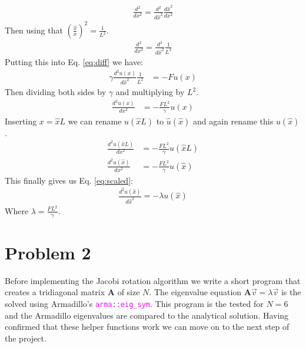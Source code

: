 \documentclass[english,notitlepage]{revtex4-1}  %
\begin{document}
\begin{align*}
    \frac{d^2}{dx^2} = \frac{d^2}{d\hat{x}^2} \frac{d\hat{x}^2}{dx^2} 
\end{align*}
Then using that $\left(\frac{\hat{x}}{x} \right)^2 = \frac{1}{L^2}$.
\begin{align*}
    \frac{d^2}{dx^2} = \frac{d^2}{d\hat{x}^2} \frac{1}{L^2} 
\end{align*}
Putting this into Eq. \ref*{eq:diff} we have:
\begin{align*}
    \gamma \frac{d^2 u(x)}{d\hat{x}^2} \frac{1}{L^2} &= - F u(x)
\end{align*}
Then dividing both sides by $\gamma$ and multiplying by $L^2$.
\begin{align*}
    \frac{d^2u(x)}{dx^2} &= - \frac{F L^2}{\gamma} u(x)
\end{align*}
Inserting $x = \hat{x}L$ we can rename $u(\hat{x}L)$ to $\hat{u}(\hat{x})$ and again rename this $u(\hat{x})$.
\begin{align*}
    \frac{d^2u(\hat{x}L)}{dx^2} &= - \frac{F L^2}{\gamma} u(\hat{x}L) \\
    \frac{d^2u(\hat{x})}{dx^2} &= - \frac{F L^2}{\gamma} u(\hat{x})
\end{align*}
This finally gives us Eq. \ref*{eq:scaled}:
\begin{align*}
    \frac{d^2u(\hat{x})}{d \hat{x}^2} = - \lambda u(\hat{x})
\end{align*}
Where $\lambda = \frac{F L^2}{\gamma}$.

\section*{Problem 2}
Before implementing the Jacobi rotation algorithm we write a short program 
that creates a tridiagonal matrix $\textbf{A}$ of size $N$. The eigenvalue 
equation $\textbf{A} \vec{v} = \lambda \vec{v}$ is the solved using Armadillo's \textcolor{magenta}{\texttt{arma::eig\_sym}}. 
This program is the tested for $N = 6$ and the Armadillo eigenvalues are compared to the analytical solution. 
Having confirmed that these helper functions work we can move on to the next step of the project.
\end{document}
